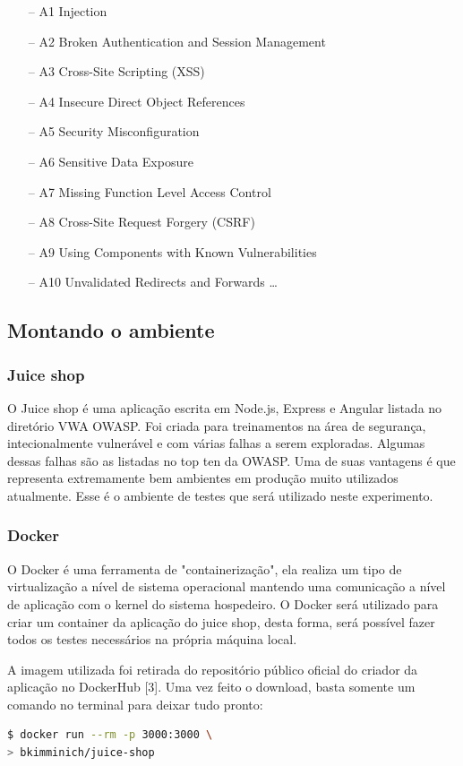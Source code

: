 \documentclass[journal]{IEEEtran}
\begin{document}
\begin{itemize}
\item[--] A1 Injection 
\item[--] A2 Broken Authentication and Session Management 
\item[--] A3 Cross-Site Scripting (XSS) 
\item[--] A4 Insecure Direct Object References 
\item[--] A5 Security Misconfiguration 
\item[--] A6 Sensitive Data Exposure 
\item[--] A7 Missing Function Level Access Control 
\item[--] A8 Cross-Site Request Forgery (CSRF) 
\item[--] A9 Using Components with Known Vulnerabilities 
\item[--] A10 Unvalidated Redirects and Forwards \ldots
\end{itemize}


\subsection{Montando o ambiente}
\subsubsection{Juice shop}
O Juice shop é uma aplicação escrita em Node.js, Express e Angular listada no diretório VWA OWASP. Foi criada para treinamentos na área de segurança, intecionalmente vulnerável e com várias falhas a serem exploradas. Algumas dessas falhas são as listadas no top ten da OWASP. Uma de suas vantagens é que representa extremamente bem ambientes em produção muito utilizados atualmente. Esse é o ambiente de testes que será utilizado neste experimento.
\\
\subsubsection{Docker}
O Docker é uma ferramenta de "containerização", ela realiza um tipo de virtualização a nível de sistema operacional mantendo uma comunicação a nível de aplicação com o kernel do sistema hospedeiro. O Docker será utilizado para criar um container da aplicação do juice shop, desta forma, será possível fazer todos os testes necessários na própria máquina local. \par
A imagem utilizada foi retirada do repositório público oficial do criador da aplicação no DockerHub [3]. Uma vez feito o download, basta somente um comando no terminal para deixar tudo pronto: \\
\begin{lstlisting}[language=bash]
$ docker run --rm -p 3000:3000 \
> bkimminich/juice-shop
\end{lstlisting}
\end{document}
